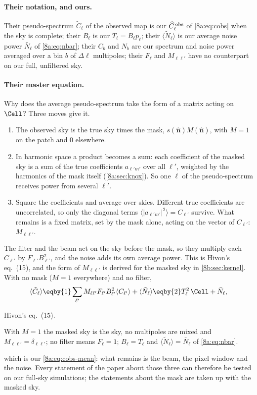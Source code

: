 \paragraph{Their notation, and ours.}
Their pseudo-spectrum $\tilde C_\ell$ of the observed map is our $\widehat C^{\,\rm obs}_\ell$ of
\eqref{8a:eq:cobs} when the sky is complete; their $B_\ell$ is our $T_\ell=B_\ell p_\ell$; their
$\langle\tilde N_\ell\rangle$ is our average noise power $\bar N_\ell$ of \eqref{8a:eq:nbar}; their
$C_b$ and $N_b$ are our spectrum and noise power averaged over a bin $b$ of $\Delta\ell$ multipoles;
their $F_\ell$ and $M_{\ell\ell'}$ have no counterpart on our full, unfiltered sky.

\paragraph{Their master equation.}
Why does the average pseudo-spectrum take the form of a matrix acting on $\Cell$? Three moves give
it.
\begin{enumerate}
  \item The observed sky is the true sky times the mask, $s(\hat{\bm n})M(\hat{\bm n})$, with $M=1$
        on the patch and $0$ elsewhere.
  \item In harmonic space a product becomes a sum: each coefficient of the masked sky is a sum of
        the true coefficients $a_{\ell'm'}$ over all $\ell'$, weighted by the harmonics of the mask
        itself (\cref{8a:sec:knox}). So one $\ell$ of the pseudo-spectrum receives power from
        several $\ell'$.
  \item Square the coefficients and average over skies. Different true coefficients are
        uncorrelated, so only the diagonal terms $\langle|a_{\ell'm'}|^2\rangle=C_{\ell'}$ survive. What
        remains is a fixed matrix, set by the mask alone, acting on the vector of $C_{\ell'}$:
        $M_{\ell\ell'}$.
\end{enumerate}
The filter and the beam act on the sky before the mask, so they multiply each $C_{\ell'}$ by
$F_{\ell'}B_{\ell'}^2$, and the noise adds its own average power. This is Hivon's eq.~(15), and
the form of $M_{\ell\ell'}$ is derived for the masked sky in \cref{8b:sec:kernel}. With no mask
($M=1$ everywhere) and no filter,
\begin{equation}
  \langle\tilde C_\ell\rangle
  \eqby{1}\sum_{\ell'}M_{\ell\ell'}F_{\ell'}B_{\ell'}^2\langle C_{\ell'}\rangle+\langle\tilde N_\ell\rangle
  \eqby{2}T_\ell^2\,\Cell+\bar N_\ell ,
  \nonumber
\end{equation}
\begin{explain}
  \item Hivon's eq.~(15).
  \item With $M=1$ the masked sky is the sky, no multipoles are mixed and $M_{\ell\ell'}=\delta_{\ell\ell'}$;
        no filter means $F_\ell=1$; $B_\ell=T_\ell$ and $\langle\tilde N_\ell\rangle=\bar N_\ell$ of \eqref{8a:eq:nbar}.
\end{explain}
which is our \eqref{8a:eq:cobs-mean}: what remains is the beam, the pixel window and the noise. Every
statement of the paper about those three can therefore be tested on our full-sky
simulations; the statements about the mask are taken up with the masked sky.

